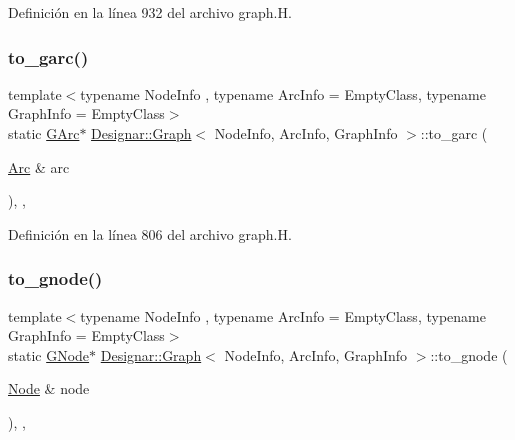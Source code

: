 Definición en la línea 932 del archivo graph.\+H.

\mbox{\label{class_designar_1_1_graph_ab79eb63dd332e483db77da69c1b04522}} 
\subsubsection{\texorpdfstring{to\+\_\+garc()}{to\_garc()}}
{\footnotesize\ttfamily template$<$typename Node\+Info , typename Arc\+Info  = Empty\+Class, typename Graph\+Info  = Empty\+Class$>$ \\
static \hyperlink{class_designar_1_1_graph_a5ad9e18b71899c2d4979426e367e5573}{G\+Arc}$\ast$ \hyperlink{class_designar_1_1_graph}{Designar\+::\+Graph}$<$ Node\+Info, Arc\+Info, Graph\+Info $>$\+::to\+\_\+garc (\begin{DoxyParamCaption}\item[{\hyperlink{class_designar_1_1_graph_a74c730ef4ce2d20f998d72bd25c2b5bf}{Arc} \&}]{arc }\end{DoxyParamCaption})\hspace{0.3cm}{\ttfamily [inline]}, {\ttfamily [static]}, {\ttfamily [protected]}}



Definición en la línea 806 del archivo graph.\+H.

\mbox{\label{class_designar_1_1_graph_a23038b7502c6fdb53b23453b19579c0e}} 
\subsubsection{\texorpdfstring{to\+\_\+gnode()}{to\_gnode()}}
{\footnotesize\ttfamily template$<$typename Node\+Info , typename Arc\+Info  = Empty\+Class, typename Graph\+Info  = Empty\+Class$>$ \\
static \hyperlink{class_designar_1_1_graph_a7e61951db0bb9bfa8a2e317440d4e17f}{G\+Node}$\ast$ \hyperlink{class_designar_1_1_graph}{Designar\+::\+Graph}$<$ Node\+Info, Arc\+Info, Graph\+Info $>$\+::to\+\_\+gnode (\begin{DoxyParamCaption}\item[{\hyperlink{class_designar_1_1_graph_a5dfc7dba9d092ac489c72e40390c37d0}{Node} \&}]{node }\end{DoxyParamCaption})\hspace{0.3cm}{\ttfamily [inline]}, {\ttfamily [static]}, {\ttfamily [protected]}}



